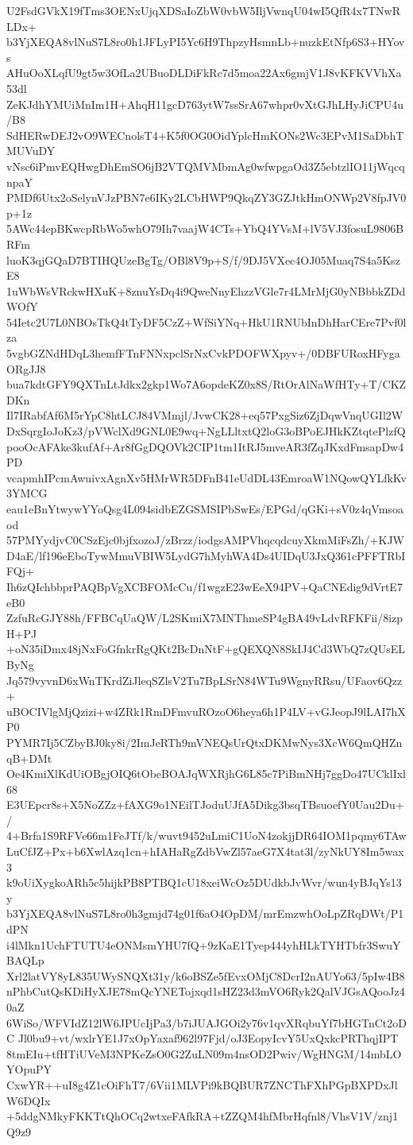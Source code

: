 U2FsdGVkX19fTms3OENxUjqXDSaIoZbW0vbW5IljVwnqU04wI5QfR4x7TNwRLDx+
b3YjXEQA8vlNuS7L8ro0h1JFLyPI5Yc6H9ThpzyHsmnLb+nuzkEtNfp6S3+HYovs
AHuOoXLqfU9gt5w3OfLa2UBuoDLDiFkRc7d5moa22Ax6gmjV1J8vKFKVVhXa53dl
ZeKJdhYMUiMnIm1H+AhqH11gcD763ytW7ssSrA67whpr0vXtGJhLHyJiCPU4u/B8
SdHERwDEJ2vO9WECnolsT4+K5f0OG0OidYplcHmKONs2Wc3EPvM1SaDbhTMUVuDY
vNsc6iPmvEQHwgDhEmSO6jB2VTQMVMbmAg0wfwpgaOd3Z5ebtzlIO11jWqcqnpaY
PMDf6Utx2oSelynVJzPBN7e6IKy2LCbHWP9QkqZY3GZJtkHmONWp2V8fpJV0p+1z
5AWc44epBKwcpRbWo5whO79Ih7vaajW4CTs+YbQ4YVsM+lV5VJ3fosuL9806BRFm
luoK3qjGQaD7BTIHQUzeBgTg/OBl8V9p+S/f/9DJ5VXec4OJ05Muaq7S4a5KszE8
1uWbWsVRckwHXuK+8znuYsDq4i9QweNnyEhzzVGle7r4LMrMjG0yNBbbkZDdWOfY
54Ietc2U7L0NBOsTkQ4tTyDF5CzZ+WfSiYNq+HkU1RNUbInDhHarCEre7Pvf0lza
5vgbGZNdHDqL3hemfFTnFNNxpclSrNxCvkPDOFWXpyv+/0DBFURoxHFygaORgJJ8
bua7kdtGFY9QXTnLtJdkx2gkp1Wo7A6opdeKZ0x8S/RtOrAlNaWfHTy+T/CKZDKn
Il7IRabfAf6M5rYpC8htLCJ84VMmjl/JvwCK28+eq57PxgSiz6ZjDqwVnqUGIl2W
DxSqrgIoJoKz3/pVWclXd9GNL0E9wq+NgLLltxtQ2loG3oBPoEJHkKZtqtePlzfQ
pooOcAFAke3kufAf+Ar8fGgDQOVk2CIP1tm1ItRJ5mveAR3fZqJKxdFmsapDw4PD
vcapmhIPcmAwuivxAgnXv5HMrWR5DFnB41eUdDL43EmroaW1NQowQYLfkKv3YMCG
eau1eBnYtwywYYoQsg4L094sidbEZGSMSIPbSwEs/EPGd/qGKi+sV0z4qVmsoaod
57PMYydjvC0CSzEjc0bjfxozoJ/zBrzz/iodgsAMPVhqcqdcuyXkmMiFsZh/+KJW
D4aE/lf196eEboTywMmuVBIW5LydG7hMyhWA4Ds4UIDqU3JxQ361cPFFTRbIFQj+
Ih6zQIchbbprPAQBpVgXCBFOMcCu/f1wgzE23wEeX94PV+QaCNEdig9dVrtE7eB0
ZzfuRcGJY88h/FFBCqUaQW/L2SKmiX7MNThmeSP4gBA49vLdvRFKFii/8izpH+PJ
+oN35iDmx48jNxFoGfnkrRgQKt2BcDnNtF+gQEXQN8SkIJ4Cd3WbQ7zQUsELByNg
Jq579vyvnD6xWnTKrdZiJleqSZlsV2Tu7BpLSrN84WTu9WgnyRRsu/UFaov6Qzz+
uBOCIVlgMjQzizi+w4ZRk1RmDFmvuROzoO6heya6h1P4LV+vGJeopJ9lLAI7hXP0
PYMR7Ij5CZbyBJ0ky8i/2ImJeRTh9mVNEQsUrQtxDKMwNys3XcW6QmQHZnqB+DMt
Oe4KmiXlKdUiOBgjOIQ6tObeBOAJqWXRjhG6L85c7PiBmNHj7ggDo47UCklIxl68
E3UEpcr8s+X5NoZZz+fAXG9o1NEilTJoduUJfA5Dikg3bsqTBsuoefY0Uau2Du+/
4+Brfa1S9RFVe66m1FeJTf/k/wuvt9452uLmiC1UoN4zokjjDR64IOM1pqmy6TAw
LuCfJZ+Px+b6XwlAzq1cn+hIAHaRgZdbVwZl57aeG7X4tat3l/zyNkUY8Im5wax3
k9oUiXygkoARh5c5hijkPB8PTBQ1cU18xeiWcOz5DUdkbJvWvr/wun4yBJqYs13y
b3YjXEQA8vlNuS7L8ro0h3gmjd74g01f6aO4OpDM/mrEmzwhOoLpZRqDWt/P1dPN
i4lMkn1UchFTUTU4eONMsmYHU7fQ+9zKaE1Tyep444yhHLkTYHTbfr3SwuYBAQLp
Xrl2latVY8yL835UWySNQXt31y/k6oBSZe5fEvxOMjC8DcrI2nAUYo63/5pIw4B8
nPhbCutQsKDiHyXJE78mQcYNETojxqd1sHZ23d3mVO6Ryk2QalVJGsAQooJz40aZ
6WiSo/WFVIdZ12lW6JPUcIjPa3/b7iJUAJGOi2y76v1qvXRqbuYf7bHGTnCt2oDC
Jl0bu9+vt/wxlrYE1J7xOpYaxaf962l97Fjd/oJ3EopyIcvY5UxQxkcPRThqjIPT
8tmEIu+tfHTiUVeM3NPKeZsO0G2ZuLN09m4nsOD2Pwiv/WgHNGM/14mbLOYOpuPY
CxwYR++uI8g4Z1cOiFhT7/6Vii1MLVPi9kBQBUR7ZNCThFXhPGpBXPDxJlW6DQIx
+5ddgNMkyFKKTtQhOCq2wtxeFAfkRA+tZZQM4hfMbrHqfnl8/VhsV1V/znj1Q9z9
